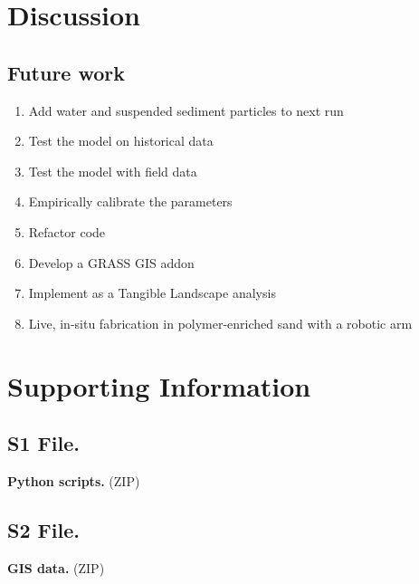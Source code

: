 \documentclass[final,3p,times,twocolumn]{elsarticle}
\begin{document}
\section{Discussion}

\subsection{Future work}
\begin{enumerate}
\item Add water and suspended sediment particles to next run
\item Test the model on historical data
\item Test the model with field data
\item Empirically calibrate the parameters
\item Refactor code
\item Develop a GRASS GIS addon
\item Implement as a Tangible Landscape analysis
\item Live, in-situ fabrication in polymer-enriched sand with a robotic arm
\end{enumerate}


\section{Supporting Information}

\subsection{S1 File.}
\label{S1_File}
{\bf Python scripts.}
(ZIP)

\subsection{S2 File.}
\label{S2_File}
{\bf GIS data.}
(ZIP)

% 
 
% 
% 
% 
% 
% 
% 
% 
% 
% 
% 
% 


\end{document}
